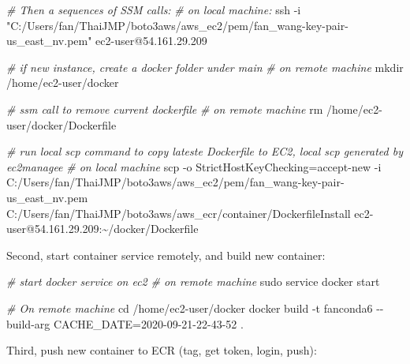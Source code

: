 \documentclass[
]{book}
\newenvironment{Shaded}{\begin{snugshade}}{\end{snugshade}}
\newcommand{\BuiltInTok}[1]{#1}
\newcommand{\CommentTok}[1]{\textcolor[rgb]{0.56,0.35,0.01}{\textit{#1}}}
\newcommand{\ExtensionTok}[1]{#1}
\newcommand{\FunctionTok}[1]{\textcolor[rgb]{0.00,0.00,0.00}{#1}}
\newcommand{\NormalTok}[1]{#1}
\newcommand{\StringTok}[1]{\textcolor[rgb]{0.31,0.60,0.02}{#1}}
\begin{document}
\begin{Shaded}
\begin{Highlighting}[]
\CommentTok{\# Then a sequences of SSM calls:}
\CommentTok{\# on local machine:}
\FunctionTok{ssh}\NormalTok{ {-}i }\StringTok{"C:/Users/fan/ThaiJMP/boto3aws/aws\_ec2/pem/fan\_wang{-}key{-}pair{-}us\_east\_nv.pem"}\NormalTok{ ec2{-}user@54.161.29.209}

\CommentTok{\# if new instance, create a docker folder under main}
\CommentTok{\# on remote machine}
\FunctionTok{mkdir}\NormalTok{ /home/ec2{-}user/docker}

\CommentTok{\# ssm call to remove current dockerfile}
\CommentTok{\# on remote machine}
\FunctionTok{rm}\NormalTok{ /home/ec2{-}user/docker/Dockerfile}

\CommentTok{\# run local scp command to copy lateste Dockerfile to EC2, local scp generated by ec2managee}
\CommentTok{\# on local machine}
\FunctionTok{scp}\NormalTok{ {-}o StrictHostKeyChecking=accept{-}new {-}i C:/Users/fan/ThaiJMP/boto3aws/aws\_ec2/pem/fan\_wang{-}key{-}pair{-}us\_east\_nv.pem C:/Users/fan/ThaiJMP/boto3aws/aws\_ecr/container/DockerfileInstall ec2{-}user@54.161.29.209:\textasciitilde{}/docker/Dockerfile}
\end{Highlighting}
\end{Shaded}

Second, start container service remotely, and build new container:

\begin{Shaded}
\begin{Highlighting}[]
\CommentTok{\# start docker service on ec2}
\CommentTok{\# on remote machine}
\FunctionTok{sudo}\NormalTok{ service docker start}

\CommentTok{\# On remote machine}
\BuiltInTok{cd}\NormalTok{ /home/ec2{-}user/docker}
\ExtensionTok{docker}\NormalTok{ build {-}t fanconda6 {-}{-}build{-}arg CACHE\_DATE=2020{-}09{-}21{-}22{-}43{-}52 .}
\end{Highlighting}
\end{Shaded}

Third, push new container to ECR (tag, get token, login, push):
\end{document}
